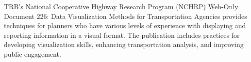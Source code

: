 TRB's National Cooperative Highway Research Program (NCHRP) Web-Only Document 226: Data Visualization Methods for Transportation Agencies provides techniques for planners who have various levels of experience with displaying and reporting information in a visual format. The publication includes practices for developing visualization skills, enhancing transportation analysis, and improving public engagement.